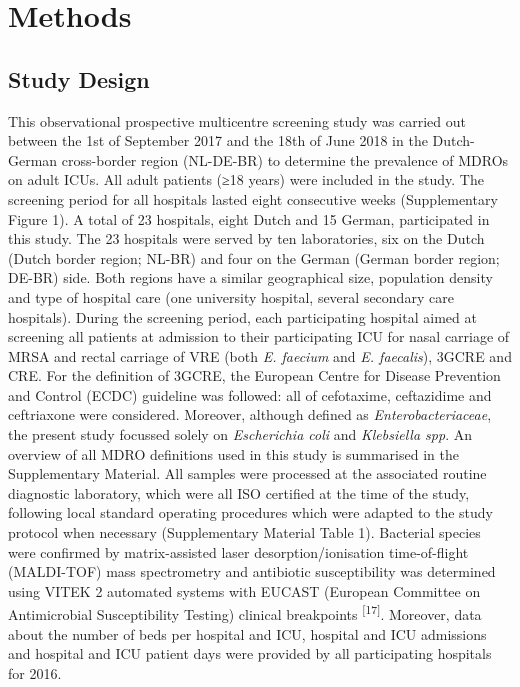 \documentclass[
]{book}
\begin{document}
\hypertarget{methods-4}{%
\section{Methods}\label{methods-4}}

\hypertarget{study-design}{%
\subsection{Study Design}\label{study-design}}

This observational prospective multicentre screening study was carried out between the 1st of September 2017 and the 18th of June 2018 in the Dutch-German cross-border region (NL-DE-BR) to determine the prevalence of MDROs on adult ICUs. All adult patients (≥18 years) were included in the study. The screening period for all hospitals lasted eight consecutive weeks (Supplementary Figure 1). A total of 23 hospitals, eight Dutch and 15 German, participated in this study. The 23 hospitals were served by ten laboratories, six on the Dutch (Dutch border region; NL-BR) and four on the German (German border region; DE-BR) side. Both regions have a similar geographical size, population density and type of hospital care (one university hospital, several secondary care hospitals). During the screening period, each participating hospital aimed at screening all patients at admission to their participating ICU for nasal carriage of MRSA and rectal carriage of VRE (both \emph{E. faecium} and \emph{E. faecalis}), 3GCRE and CRE. For the definition of 3GCRE, the European Centre for Disease Prevention and Control (ECDC) guideline was followed: all of cefotaxime, ceftazidime and ceftriaxone were considered. Moreover, although defined as \emph{Enterobacteriaceae}, the present study focussed solely on \emph{Escherichia coli} and \emph{Klebsiella spp}. An overview of all MDRO definitions used in this study is summarised in the Supplementary Material. All samples were processed at the associated routine diagnostic laboratory, which were all ISO certified at the time of the study, following local standard operating procedures which were adapted to the study protocol when necessary (Supplementary Material Table 1). Bacterial species were confirmed by matrix-assisted laser desorption/ionisation time-of-flight (MALDI-TOF) mass spectrometry and antibiotic susceptibility was determined using VITEK 2 automated systems with EUCAST (European Committee on Antimicrobial Susceptibility Testing) clinical breakpoints \textsuperscript{{[}17{]}}. Moreover, data about the number of beds per hospital and ICU, hospital and ICU admissions and hospital and ICU patient days were provided by all participating hospitals for 2016.
\end{document}
